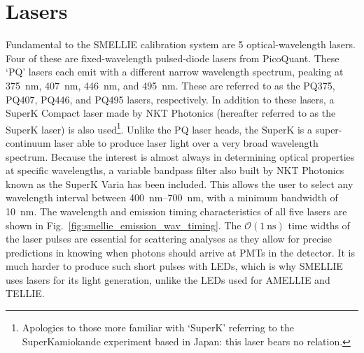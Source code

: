 \section{Lasers}\label{sec:smellie_lasers}
Fundamental to the SMELLIE calibration system are 5 optical-wavelength lasers. Four of these are fixed-wavelength pulsed-diode lasers from PicoQuant. These `PQ' lasers each emit with a different narrow wavelength spectrum, peaking at \SI{375}{\nm}, \SI{407}{\nm}, \SI{446}{\nm}, and \SI{495}{\nm}. These are referred to as the PQ375, PQ407, PQ446, and PQ495 lasers, respectively. In addition to these lasers, a SuperK Compact laser made by NKT Photonics (hereafter referred to as the SuperK laser) is also used\footnote{
    Apologies to those more familiar with `SuperK' referring to the SuperKamiokande experiment based in Japan: this laser bears no relation.
}. Unlike the PQ laser heads, the SuperK is a super-continuum laser able to produce laser light over a very broad wavelength spectrum. Because the interest is almost always in determining optical properties at specific wavelengths, a variable bandpass filter also built by NKT Photonics known as the SuperK Varia has been included. This allows the user to select any wavelength interval between \SIrange{400}{700}{\nm}, with a minimum bandwidth of \SI{10}{\nm}. The wavelength and emission timing characteristics of all five lasers are shown in Fig.~\ref{fig:smellie_emission_wav_timing}. The $\mathcal{O}(\SI{1}{\ns})$ time widths of the laser pulses are essential for scattering analyses as they allow for precise predictions in knowing when photons should arrive at PMTs in the detector. It is much harder to produce such short pulses with LEDs, which is why SMELLIE uses lasers for its light generation, unlike the LEDs used for AMELLIE and TELLIE.

